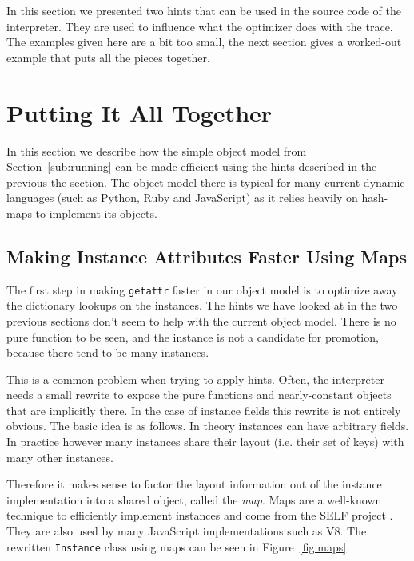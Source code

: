 \documentclass{sig-alternate}
\let\oldcite=\cite
\renewcommand\cite[1]{\ifthenelse{\equal{#1}{XXX}}{[citation~needed]}{\oldcite{#1}}}
\begin{document}
In this section we presented two hints that can be used in the source code
of the interpreter. They are used to influence what the optimizer does with the
trace. The examples given here are a bit too small, the next
section gives a worked-out example that puts all the pieces together.


\section{Putting It All Together}
\label{sec:fastobjmodel}

In this section we describe how the simple object model from
Section~\ref{sub:running} can be made efficient using the hints described in the
previous the section. The object model there is typical for many current
dynamic languages (such as Python, Ruby and JavaScript) as it relies heavily on
hash-maps to implement its objects.


\subsection{Making Instance Attributes Faster Using Maps}

The first step in making \texttt{getattr} faster in our object model is to optimize
away the dictionary lookups on the instances. The hints we have looked at in the
two previous sections don't seem to help with the current object model. There is
no pure function to be seen, and the instance is not a candidate for promotion,
because there tend to be many instances.

This is a common problem when trying to apply hints. Often, the interpreter
needs a small rewrite to expose the pure functions and nearly-constant objects
that are implicitly there. In the case of instance fields this rewrite is not
entirely obvious. The basic idea is as follows. In theory instances can have
arbitrary fields. In practice however many instances share their layout (i.e.
their set of keys) with many other instances.

Therefore it makes sense to factor the layout information out of the instance
implementation into a shared object, called the \emph{map}. Maps are a well-known
technique to efficiently implement instances and come from the SELF project
\cite{XXX}. They are also used by many JavaScript implementations such as V8.
The rewritten \texttt{Instance} class using maps can be seen in
Figure~\ref{fig:maps}.
\end{document}
